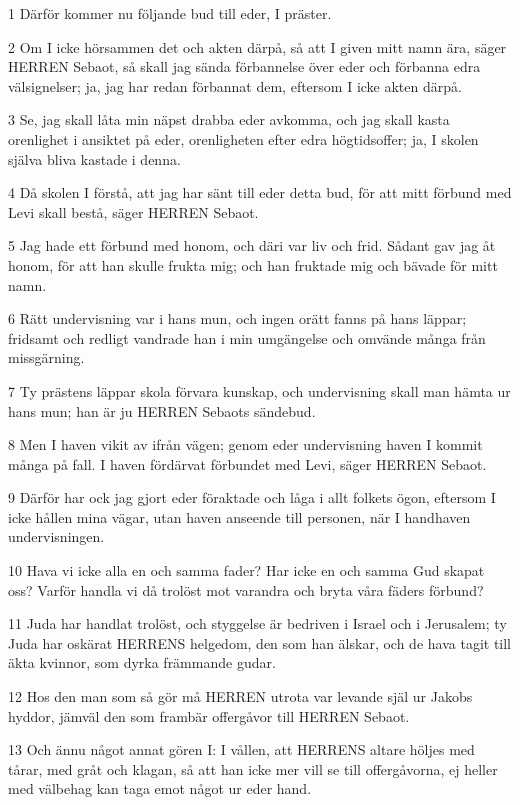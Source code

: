 \par 1 Därför kommer nu följande bud till eder, I präster.
\par 2 Om I icke hörsammen det och akten därpå, så att I given mitt namn ära, säger HERREN Sebaot, så skall jag sända förbannelse över eder och förbanna edra välsignelser; ja, jag har redan förbannat dem, eftersom I icke akten därpå.
\par 3 Se, jag skall låta min näpst drabba eder avkomma, och jag skall kasta orenlighet i ansiktet på eder, orenligheten efter edra högtidsoffer; ja, I skolen själva bliva kastade i denna.
\par 4 Då skolen I förstå, att jag har sänt till eder detta bud, för att mitt förbund med Levi skall bestå, säger HERREN Sebaot.
\par 5 Jag hade ett förbund med honom, och däri var liv och frid. Sådant gav jag åt honom, för att han skulle frukta mig; och han fruktade mig och bävade för mitt namn.
\par 6 Rätt undervisning var i hans mun, och ingen orätt fanns på hans läppar; fridsamt och redligt vandrade han i min umgängelse och omvände många från missgärning.
\par 7 Ty prästens läppar skola förvara kunskap, och undervisning skall man hämta ur hans mun; han är ju HERREN Sebaots sändebud.
\par 8 Men I haven vikit av ifrån vägen; genom eder undervisning haven I kommit många på fall. I haven fördärvat förbundet med Levi, säger HERREN Sebaot.
\par 9 Därför har ock jag gjort eder föraktade och låga i allt folkets ögon, eftersom I icke hållen mina vägar, utan haven anseende till personen, när I handhaven undervisningen.
\par 10 Hava vi icke alla en och samma fader? Har icke en och samma Gud skapat oss? Varför handla vi då trolöst mot varandra och bryta våra fäders förbund?
\par 11 Juda har handlat trolöst, och styggelse är bedriven i Israel och i Jerusalem; ty Juda har oskärat HERRENS helgedom, den som han älskar, och de hava tagit till äkta kvinnor, som dyrka främmande gudar.
\par 12 Hos den man som så gör må HERREN utrota var levande själ ur Jakobs hyddor, jämväl den som frambär offergåvor till HERREN Sebaot.
\par 13 Och ännu något annat gören I: I vållen, att HERRENS altare höljes med tårar, med gråt och klagan, så att han icke mer vill se till offergåvorna, ej heller med välbehag kan taga emot något ur eder hand.
